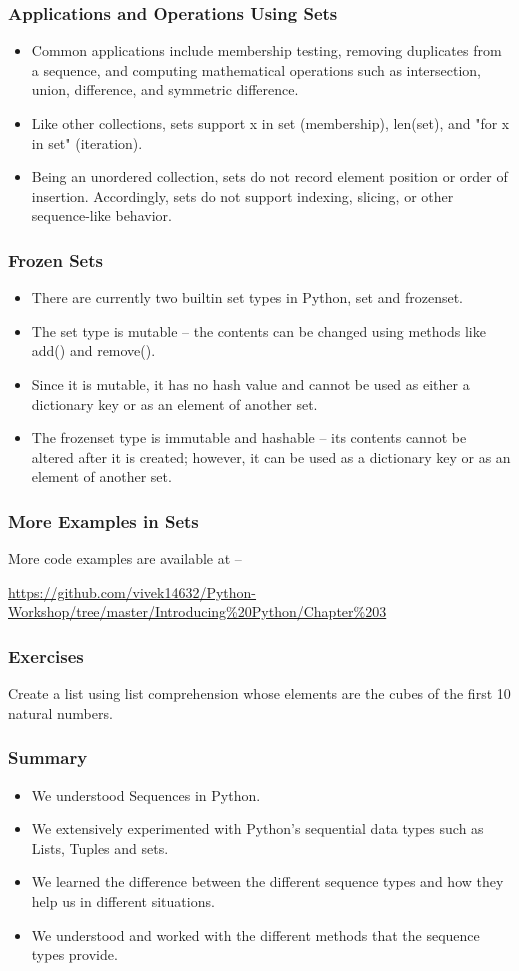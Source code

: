 \documentclass{beamer}
\begin{document}
\begin{frame}
\frametitle{Applications and Operations Using Sets}
\begin{itemize}
\item Common applications include membership testing, removing duplicates from a sequence, and computing mathematical operations such as intersection, union, difference, and symmetric difference.
\item Like other collections, sets support x in set (membership), len(set), and "for x in set" (iteration). 
\item Being an unordered collection, sets do not record element position or order of insertion. Accordingly, sets do not support indexing, slicing, or other sequence-like behavior.
\end{itemize}
\end{frame}

\begin{frame}
\frametitle{Frozen Sets}
\begin{itemize}
\item There are currently two builtin set types in Python, set and frozenset. 
\item The set type is mutable -- the contents can be changed using methods like add() and remove(). 
\item Since it is mutable, it has no hash value and cannot be used as either a dictionary key or as an element of another set. 
\item The frozenset type is immutable and hashable -- its contents cannot be altered after it is created; however, it can be used as a dictionary key or as an element of another set.
\end{itemize}
\end{frame}

\begin{frame}
\frametitle{More Examples in Sets}
More code examples are available at --
 
\url{https://github.com/vivek14632/Python-Workshop/tree/master/Introducing\%20Python/Chapter\%203}
\end{frame}


\begin{frame}
\frametitle{Exercises}
Create a list using list comprehension whose elements are the cubes of the first 10 natural numbers.

\end{frame}

\begin{frame}
\frametitle{Summary}
\begin{itemize}
\item We understood Sequences in Python.
\item We extensively experimented with Python's sequential data types such as Lists, Tuples and sets.
\item We learned the difference between the different sequence types and how they help us in different situations.
\item We understood and worked with the different methods that the sequence types provide.
\end{itemize}
\end{frame}
\end{document}
